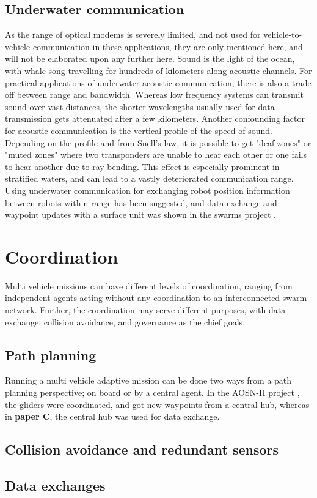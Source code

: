 \subsection{Underwater communication}
As the range of optical modems is severely limited, and not used for vehicle-to-vehicle communication in these applications, they are only mentioned here, and will not be elaborated upon any further here. Sound is the light of the ocean,  with whale song travelling for hundreds of kilometers along acoustic channels. For practical applications of underwater acoustic communication, there is also a trade off between range and bandwidth. Whereas low frequency systems can transmit sound over vast distances, the shorter wavelengths usually used for data transmission gets attenuated after a few kilometers\cite{stojanovic1996recent}. Another confounding factor for acoustic communication is the vertical profile of the speed of sound. Depending on the profile and from Snell's law, it is possible to get "deaf zones" or "muted zones" where two transponders are unable to hear each other or one fails to hear another due to ray-bending. This effect is especially prominent in stratified waters, and can lead to a vastly deteriorated communication range. Using underwater communication for exchanging robot position information between robots within range has been suggested\cite{berget2022adaptive}, and data exchange and waypoint updates with a surface unit was shown in the \acrfull{swarms} project \cite{real2016smart}. 

\section{Coordination}
Multi vehicle missions can have different levels of coordination, ranging from independent agents acting without any coordination to an interconnected swarm network. Further, the coordination may serve different purposes, with data exchange, collision avoidance, and governance as the chief goals.  

\subsection{Path planning}
Running a multi vehicle adaptive mission can be done two ways from a path planning perspective; on board or by a central agent. In the AOSN-II project \cite{leonard2007collective}, the gliders were coordinated, and got new waypoints from a central hub, whereas in \textbf{paper C}, the central hub was used for data exchange.  

\subsection{Collision avoidance and redundant sensors}

\subsection{Data exchanges}
